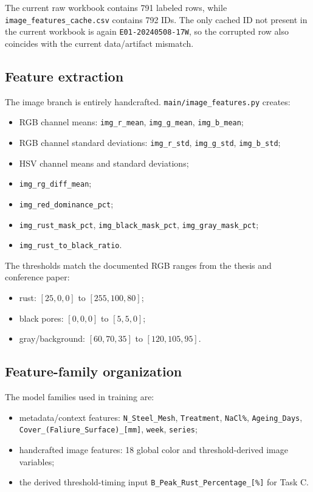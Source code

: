 \documentclass[11pt]{article}
\begin{document}
The current raw workbook contains 791 labeled rows, while \texttt{image\_features\_cache.csv} contains 792 IDs. The only cached ID not present in the current workbook is again \texttt{E01-20240508-17W}, so the corrupted row also coincides with the current data/artifact mismatch.

\subsection{Feature extraction}
The image branch is entirely handcrafted. \texttt{main/image\_features.py} creates:
\begin{itemize}
  \item RGB channel means: \texttt{img\_r\_mean}, \texttt{img\_g\_mean}, \texttt{img\_b\_mean};
  \item RGB channel standard deviations: \texttt{img\_r\_std}, \texttt{img\_g\_std}, \texttt{img\_b\_std};
  \item HSV channel means and standard deviations;
  \item \texttt{img\_rg\_diff\_mean};
  \item \texttt{img\_red\_dominance\_pct};
  \item \texttt{img\_rust\_mask\_pct}, \texttt{img\_black\_mask\_pct}, \texttt{img\_gray\_mask\_pct};
  \item \texttt{img\_rust\_to\_black\_ratio}.
\end{itemize}

The thresholds match the documented RGB ranges from the thesis and conference paper:
\begin{itemize}
  \item rust: \([25,0,0]\) to \([255,100,80]\);
  \item black pores: \([0,0,0]\) to \([5,5,0]\);
  \item gray/background: \([60,70,35]\) to \([120,105,95]\).
\end{itemize}

\subsection{Feature-family organization}
The model families used in training are:
\begin{itemize}
  \item metadata/context features: \texttt{N\_Steel\_Mesh}, \texttt{Treatment}, \texttt{NaCl\%}, \texttt{Ageing\_Days}, \texttt{Cover\_(Faliure\_Surface)\_[mm]}, \texttt{week}, \texttt{series};
  \item handcrafted image features: 18 global color and threshold-derived image variables;
  \item the derived threshold-timing input \texttt{B\_Peak\_Rust\_Percentage\_[\%]} for Task C.
\end{itemize}
\end{document}
